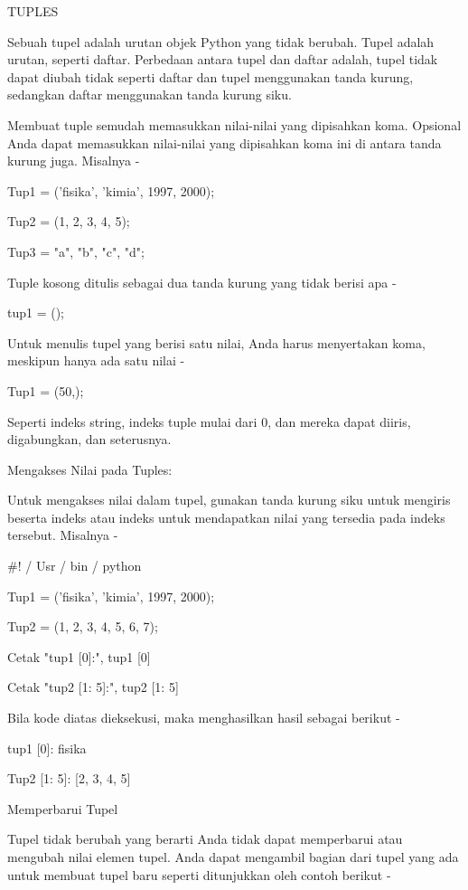 TUPLES \par
Sebuah tupel adalah urutan objek Python yang tidak berubah. Tupel adalah urutan, seperti daftar. Perbedaan antara tupel dan daftar adalah, tupel tidak dapat diubah tidak seperti daftar dan tupel menggunakan tanda kurung, sedangkan daftar menggunakan tanda kurung siku. \par
Membuat tuple semudah memasukkan nilai-nilai yang dipisahkan koma. Opsional Anda dapat memasukkan nilai-nilai yang dipisahkan koma ini di antara tanda kurung juga. Misalnya - \par
\vspace{12pt}
Tup1 = ('fisika', 'kimia', 1997, 2000); \par
Tup2 = (1, 2, 3, 4, 5); \par
Tup3 = "a", "b", "c", "d"; \par
Tuple kosong ditulis sebagai dua tanda kurung yang tidak berisi apa - \par
tup1 = (); \par
Untuk menulis tupel yang berisi satu nilai, Anda harus menyertakan koma, meskipun hanya ada satu nilai - \par
Tup1 = (50,); \par
Seperti indeks string, indeks tuple mulai dari 0, dan mereka dapat diiris, digabungkan, dan seterusnya. \par
Mengakses Nilai pada Tuples: \par
Untuk mengakses nilai dalam tupel, gunakan tanda kurung siku untuk mengiris beserta indeks atau indeks untuk mendapatkan nilai yang tersedia pada indeks tersebut. Misalnya - \par
 $  \#  $! / Usr / bin / python \par
\vspace{12pt}
Tup1 = ('fisika', 'kimia', 1997, 2000); \par
Tup2 = (1, 2, 3, 4, 5, 6, 7); \par
\vspace{12pt}
Cetak "tup1 [0]:", tup1 [0] \par
Cetak "tup2 [1: 5]:", tup2 [1: 5] \par
Bila kode diatas dieksekusi, maka menghasilkan hasil sebagai berikut - \par
tup1 [0]: fisika \par
Tup2 [1: 5]: [2, 3, 4, 5] \par
Memperbarui Tupel \par
Tupel tidak berubah yang berarti Anda tidak dapat memperbarui atau mengubah nilai elemen tupel. Anda dapat mengambil bagian dari tupel yang ada untuk membuat tupel baru seperti ditunjukkan oleh contoh berikut - \par
